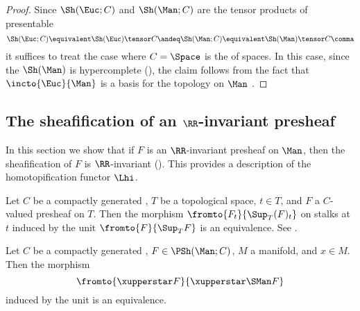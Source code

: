 \begin{proof}
	Since $ \Sh(\Euc;C) $ and $ \Sh(\Man;C) $ are the tensor products of presentable \categories
	\begin{equation*}
		\Sh(\Euc;C) \equivalent \Sh(\Euc) \tensor C \andeq \Sh(\Man;C) \equivalent \Sh(\Man) \tensor C \comma
	\end{equation*}
	it suffices to treat the case where $ C = \Space $ is the \category of spaces.
	In this case, since the \topos $ \Sh(\Man) $ is hypercomplete (), the claim follows from the fact that $ \incto{\Euc}{\Man} $ is a basis for the topology on $ \Man $ \cite[Corollary 3.12.13]{exodromy}.
\end{proof}


\subsection{The sheafification of an \texorpdfstring{$ \RR $}{ℝ}-invariant presheaf}\label{sec:sheafificationpreservesinvariance}

In this section we show that if $ F $ is an $ \RR $-invariant presheaf on $ \Man $, then the sheafification of $ F $ is $ \RR $-invariant ().
This provides a description of the homotopification functor $ \Lhi $.

\begin{recollection}\label{app.rec:stalksandsheafification}
	Let $ C $ be a compactly generated \category, $ T $ be a topological space, $ t \in T $, and $ F $ a $ C $-valued presheaf on $ T $.
	Then the morphism $ \fromto{F_t}{\Sup_{T}(F)_t} $ on stalks at $ t $ induced by the unit $ \fromto{F}{\Sup_{T} F} $ is an equivalence.
	See \cite[Proposition 4.1.4]{Broken}.
\end{recollection}

\begin{lemma}\label{app.lem:stalksbeforesheafification}
	Let $ C $ be a compactly generated \category, $ F \in \PSh(\Man;C) $, $ M $ a manifold, and $ x \in M $.
	Then the morphism
	\begin{equation*}
		\fromto{\xupperstar F}{\xupperstar \SMan F}
	\end{equation*}
	induced by the unit is an equivalence.
\end{lemma}

